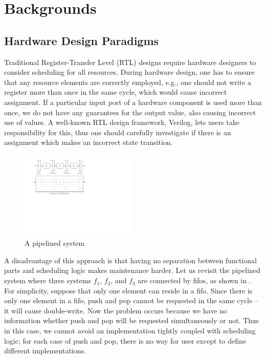 \chapter{Backgrounds}
\label{chap:backgrounds}

\section{Hardware Design Paradigms}
\label{sec:design-paradigm}

Traditional Register-Transfer Level (RTL) designs require hardware
designers to consider scheduling for all resources. During hardware
design, one has to ensure that any resource elements are correctly
employed, e.g., one should not write a register more than once in the
same cycle, which would cause incorrect assignment. If a particular
input port of a hardware component is used more than once, we do not
have any guarantees for the output value, also causing incorrect use
of values. A well-known RTL design framework, Verilog, lets users take
responsibility for this, thus one should carefully investigate if
there is an assignment which makes an incorrect state transition.
\begin{figure}[h]
  \centering
  \includegraphics[width=0.5\textwidth]{figures/pipeline.pdf}
  \caption{A pipelined system}
  \label{fig-pipelined-system}
\end{figure}

A disadvantage of this approach is that having no separation between
functional parts and scheduling logic makes maintenance harder. Let us
revisit the pipelined system where three systems $f_1$, $f_2$, and
$f_3$ are connected by fifos, as shown in
. For simplicity, suppose that only one
element can reside in a fifo. Since there is only one element in a
fifo, push and pop cannot be requested in the same cycle -- it will
cause double-write. Now the problem occurs because we have no
information whether push and pop will be requested simultaneously or
not. Thus in this case, we cannot avoid an implementation tightly
coupled with scheduling logic; for each case of push and pop, there is
no way for user except to define different implementations.


